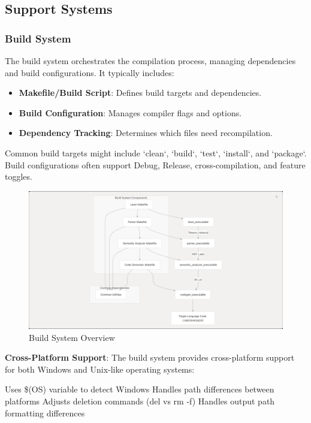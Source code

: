 \documentclass[conference]{IEEEtran}
\begin{document}
\subsection{Support Systems}

\subsubsection{Build System}
The build system orchestrates the compilation process, managing dependencies and build configurations. It typically includes: %
\begin{itemize}
    \item \textbf{Makefile/Build Script}: Defines build targets and dependencies.
    \item \textbf{Build Configuration}: Manages compiler flags and options.
    \item \textbf{Dependency Tracking}: Determines which files need recompilation.
\end{itemize}
Common build targets might include `clean`, `build`, `test`, `install`, and `package`. Build configurations often support Debug, Release, cross-compilation, and feature toggles.
\begin{figure}[H] %
    \centering
    \includegraphics[width=1\linewidth]{buildsys.png} %
    \caption{Build System Overview}
    \label{fig:buildsys} %
\end{figure}

\textbf{Cross-Platform Support}:
The build system provides cross-platform support for both Windows and Unix-like operating systems:

Uses \$(OS) variable to detect Windows
Handles path differences between platforms
Adjusts deletion commands (del vs rm -f)
Handles output path formatting differences
\end{document}
